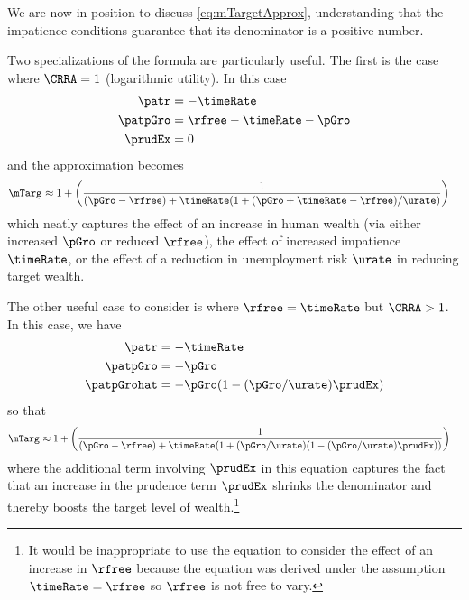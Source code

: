 \documentclass{\handout}
\begin{document}
We are now in position to discuss \eqref{eq:mTargetApprox}, understanding that the
impatience conditions guarantee that its denominator is a positive number.

Two specializations of the formula are particularly useful.  The first is
the case where $\CRRA = 1$ (logarithmic utility).  In this case
\begin{equation}\begin{gathered}\begin{aligned}
    \patr & =  -\timeRate
\\  \patpGro & =  \rfree-\timeRate-\pGro
\\  \prudEx & =  0
\end{aligned}\end{gathered}\end{equation}
and the approximation becomes
\begin{equation}\begin{gathered}\begin{aligned}
 \mTarg^{\null} & \approx  1 + \left(\frac{1}{(\pGro-\rfree)+\timeRate(1+(\pGro+\timeRate-\rfree)/\urate)}\right)
\end{aligned}\end{gathered}\end{equation}
which neatly captures the effect of an increase in human wealth (via either increased $\pGro$ or reduced $\rfree$), the effect of increased impatience $\timeRate$,
or the effect of a reduction in unemployment risk $\urate$ in reducing target wealth.


The other useful case to consider is where $\rfree = \timeRate$ but $\CRRA>1$.  In this case, we have
\begin{equation}\begin{gathered}\begin{aligned}
    \patr & =  -\timeRate
\\  \patpGro & =  -\pGro
\\  \patpGrohat & =  -\pGro (1-(\pGro/\urate)\prudEx)
\end{aligned}\end{gathered}\end{equation}
so that
\begin{equation}\begin{gathered}\begin{aligned}
 \mTarg^{\null} & \approx  1 + \left(\frac{1}{(\pGro-\rfree)+\timeRate(1+(\pGro/\urate)(1-(\pGro/\urate)\prudEx))}\right)
\end{aligned}\end{gathered}\end{equation}
where the additional term involving $\prudEx$ in this equation
captures the fact that an increase in the prudence term $\prudEx$
shrinks the denominator and thereby boosts the target level of
wealth.\footnote{It would be inappropriate to use the equation to
  consider the effect of an increase in $\rfree$ because the equation was derived under the
  assumption $\timeRate=\rfree$ so $\rfree$ is not free to vary.}
\end{document}
